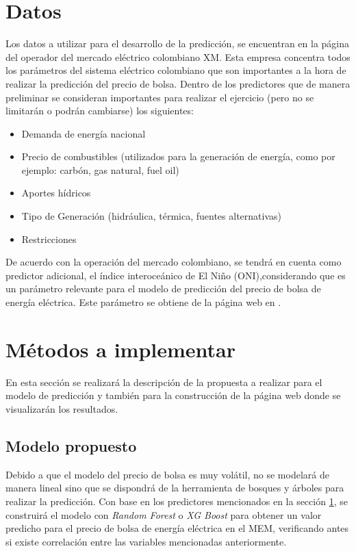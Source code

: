 \documentclass[conference, 10pt]{IEEEtran}
\begin{document}
\section{Datos} \label{sec:data}
Los datos a utilizar para el desarrollo de la predicción, se encuentran en la página del operador del mercado eléctrico colombiano XM. Esta empresa concentra todos los parámetros del sistema eléctrico colombiano que son importantes a la hora de realizar la predicción del precio de bolsa. Dentro de los predictores que de manera preliminar se consideran importantes para realizar el ejercicio (pero no se limitarán o podrán cambiarse) los siguientes:
\begin{itemize}
\item Demanda de energía nacional 
\item Precio de combustibles (utilizados para la generación de energía, como por ejemplo: carbón, gas natural, fuel oil)
\item Aportes hídricos 
\item Tipo de Generación (hidráulica, térmica, fuentes alternativas) 
\item Restricciones
\end{itemize}
De acuerdo con la operación del mercado colombiano, se tendrá en cuenta como predictor adicional, el índice interoceánico de El Niño (ONI),considerando que es un parámetro relevante para el modelo de predicción del precio de bolsa de energía eléctrica. Este parámetro se obtiene de la página web en \cite{b3}. 

\section{Métodos a implementar} \label{sec:meth}
En esta sección se realizará la descripción de la propuesta a realizar para el modelo de predicción y también para la construcción de la página web donde se visualizarán los resultados.
\subsection{Modelo propuesto} \label{sec:prop}
Debido a que el modelo del precio de bolsa es muy volátil, no se modelará de manera lineal sino que se dispondrá de la herramienta de bosques y árboles para realizar la predicción. Con base en los predictores mencionados en la sección \ref{sec:data}, se construirá el modelo con \textit{Random Forest} o \textit{XG Boost} para obtener un valor predicho para el precio de bolsa de energía eléctrica en el MEM, verificando antes si existe correlación entre las variables mencionadas anteriormente. \
\end{document}
